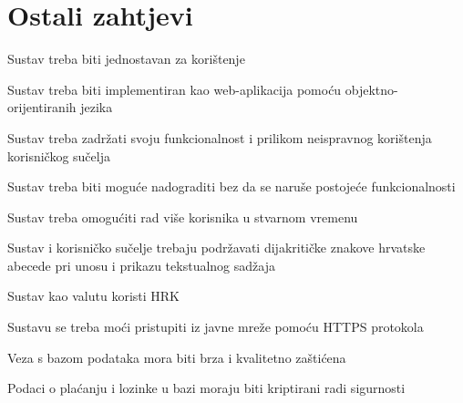 				
				\eject
	
		\section{Ostali zahtjevi}
		
		\begin{packed_item}
			
			\item  Sustav treba biti jednostavan za korištenje
			\item  Sustav treba biti implementiran kao web-aplikacija pomoću objektno-orijentiranih jezika
			\item  Sustav treba zadržati svoju funkcionalnost i prilikom neispravnog korištenja korisničkog sučelja
			\item  Sustav treba biti moguće nadograditi bez da se naruše postojeće funkcionalnosti
			\item  Sustav treba omogućiti rad više korisnika u stvarnom vremenu
			\item  Sustav i korisničko sučelje trebaju podržavati dijakritičke znakove hrvatske abecede pri unosu i prikazu tekstualnog sadžaja
			\item  Sustav kao valutu koristi HRK
			\item  Sustavu se treba moći pristupiti iz javne mreže pomoću HTTPS protokola
			\item  Veza s bazom podataka mora biti brza i kvalitetno zaštićena
			\item  Podaci o plaćanju i lozinke u bazi moraju biti kriptirani radi sigurnosti
			
		\end{packed_item}
			
			 
			 
			 
	